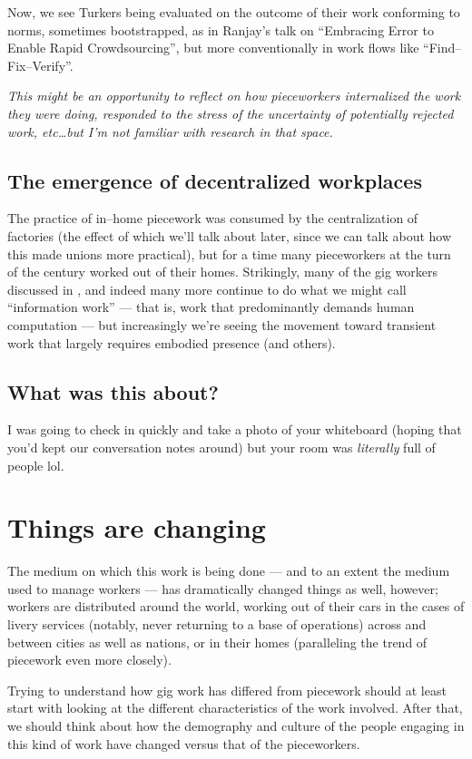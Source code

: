 \documentclass{sigchi}
\begin{document}
Now, we see Turkers being evaluated on the outcome of their work conforming to norms,
sometimes bootstrapped,
as in Ranjay's talk on 
``Embracing Error to Enable Rapid Crowdsourcing'',
but more conventionally in work flows like ``Find--Fix--Verify''.

\textit{This might be an opportunity to reflect on
how pieceworkers internalized the work they were doing,
responded to the stress of the uncertainty of potentially rejected work,
etc\dots but I'm not familiar with research in that space.}

\subsection{The emergence of decentralized workplaces}
The practice of in--home piecework was consumed by
the centralization of factories
(the effect of which we'll talk about later, since
we can talk about how this made unions more practical),
but for a time many pieceworkers
at the turn of the  century
worked out of their homes.
Strikingly, many of the gig workers
\citeauthor{crowdworkFuture}
discussed in
\citeyear{crowdworkFuture},
and indeed many more continue to do what we might call ``information work''
--- that is, work that predominantly demands human computation ---
but increasingly we're seeing the movement toward transient work that largely requires embodied presence
\cite{uberAlgorithm} (and others).

\subsection{What was this about?}
I was going to check in quickly and take a photo of your whiteboard
(hoping that you'd kept our conversation notes around)
but your room was \textit{literally} full of people lol.


\section{Things are changing}
The medium on which this work is being done
--- and to an extent the medium used to manage workers ---
has dramatically changed things as well, however;
workers are distributed around the world,
working out of their cars in the cases of livery services
(notably, never returning to a base of operations)
across and between cities as well as nations,
or in their homes
(paralleling the trend of piecework even more closely).

Trying to understand how gig work has differed from piecework should at least
start with looking at the different characteristics of the work involved.
After that, we should think about how
the demography and culture of the people engaging in this kind of work
have changed versus that of the pieceworkers.
\end{document}
